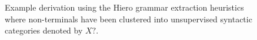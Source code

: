 \begin{figure}
  \centering
\caption{Example derivation using the Hiero grammar extraction heuristics where non-terminals have been clustered into unsupervised syntactic categories denoted by $X?$.}
\label{fig:intro_labelled_hiero}
\end{figure}

